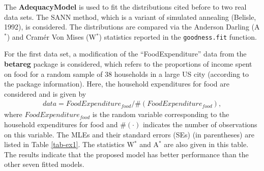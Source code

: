 \documentclass[12pt,a4paper]{article} %
\begin{document}
The {\bf AdequacyModel} is used to fit the distributions cited before to two real data sets. The SANN method, which is a
variant of simulated annealing (Belisle, 1992), is considered. The distributions are compared via the Anderson
Darling (A$^{*}$) and Cram\'er Von Mises (W$^{*}$) statistics reported in the {\tt goodness.fit} function.

For the first data set, a modification of the ``FoodExpenditure'' data from the {\bf betareg} package  is considered, which refers
to the proportions of income spent on food for a random sample of 38 households in a large US city (according to the package information).
Here, the household expenditures for food are considered and is given by
\begin{eqnarray*}
data = FoodExpenditure_{food} / \#(FoodExpenditure_{food}),
\end{eqnarray*}
where $FoodExpenditure_{food}$ is the random variable corresponding to the household expenditures for food and $\#(\cdot)$ indicates the number of
observations on this variable. The MLEs and their standard errors (SEs) (in parentheses) are listed in Table \ref{tab-ex1}.
The statistics  W$^{*}$ and A$^{*}$ are also given in this table. The results indicate that the proposed model has better performance than the other
seven fitted models.
\end{document}
